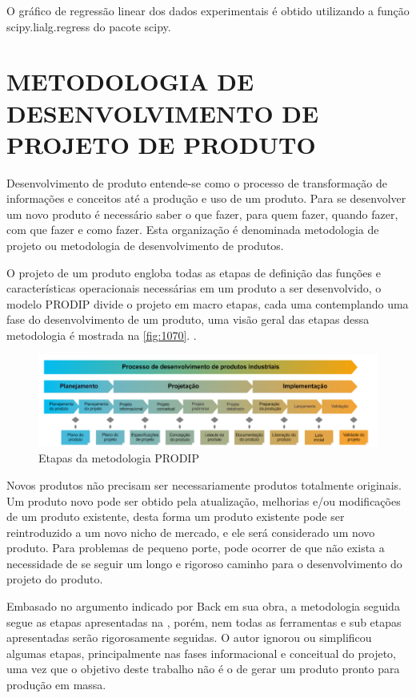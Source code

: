 O gráfico de regressão linear dos dados experimentais é obtido utilizando a função scipy.lialg.regress do pacote scipy.

\section{METODOLOGIA DE DESENVOLVIMENTO DE PROJETO DE PRODUTO}

Desenvolvimento de produto entende-se como o processo de transformação de informações e conceitos até a produção e uso de um produto. Para se desenvolver um novo produto
é necessário saber o que fazer, para quem fazer, quando fazer, com que fazer e como fazer. Esta organização é denominada metodologia de projeto ou metodologia de
desenvolvimento de produtos. \autocite{Back2008}

O projeto de um produto engloba todas as etapas de definição das funções e características operacionais necessárias em um produto a ser desenvolvido, o modelo PRODIP
divide o projeto em macro etapas, cada uma contemplando uma fase do desenvolvimento de um produto, uma visão geral das etapas dessa metodologia é mostrada na \autoref{fig:1070}.
\autocite{PRODIP}.

\begin{figure}[htb]
	\caption{\label{fig:1170}Etapas da metodologia PRODIP}
	\begin{center}
		\includegraphics[width=\textwidth]{pictures/1170.png}
	\end{center}
\end{figure}

Novos produtos não precisam ser necessariamente produtos totalmente originais. Um produto novo pode ser obtido pela atualização, melhorias e/ou modificações de um produto
existente, desta forma um produto existente pode ser reintroduzido a um novo nicho de mercado, e ele será considerado um novo produto. Para problemas de pequeno porte, pode
ocorrer de que não exista a necessidade de se seguir um longo e rigoroso caminho para o desenvolvimento do projeto do produto. \autocite{Back2008}

Embasado no argumento indicado por Back em sua obra, a metodologia seguida segue as etapas apresentadas na \autocite{PRODIP}, porém, nem todas as ferramentas e sub etapas
apresentadas serão rigorosamente seguidas. O autor ignorou ou simplificou algumas etapas, principalmente nas fases informacional e conceitual do projeto, uma vez que o
objetivo deste trabalho não é o de gerar um produto pronto para produção em massa.

